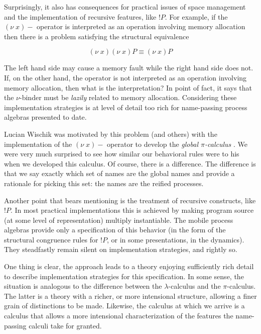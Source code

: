 \documentclass[]{amsart}
\newcommand{\scong}{\mathbin{\equiv}}
\theoremstyle{definition}
\theoremstyle{remark}
\numberwithin{equation}{subsection}
\newcommand{\pic}{$\pi$-calculus}
\begin{document}
Surprisingly, it also has consequences for practical issues of space
management and the implementation of recursive features, like
$!P$. For example, if the $(\nu \; x)-$ operator is interpreted as an
operation involving memory allocation then there is a problem
satisfying the structural equivalence

\begin{equation*}
	(\nu \; x)(\nu \; x)P \scong (\nu \; x)P
\end{equation*}

The left hand side may cause a memory fault while the right hand side
does not. If, on the other hand, the operator is not interpreted as an
operation involving memory allocation, then what is the
interpretation? In point of fact, it says that the $\nu$-binder must
be \textit{lazily} related to memory allocation. Considering these
implementation strategies is at level of detail too rich for
name-passing process algebras presented to date.

Lucian Wischik was motivated by this problem (and others) with the
implementation of the $(\nu \; x)-$ operator to develop the \textit{global
{\pic}} \cite{globalpi}. We were very much surprised to see how similar our
behavioral rules were to his when we developed this calculus. Of
course, there is a difference. The difference is that we say exactly
which set of names are the global names and provide a rationale for
picking this set: the names are the reified processes.

Another point that bears mentioning is the treatment of recursive
constructs, like $!P$. In most practical implementations this is
achieved by making program source (at some level of representation)
multiply instantiable. The mobile process algebras provide only a
specification of this behavior (in the form of the structural
congruence rules for $!P$, or in some presentations, in the
dynamics). They steadfastly remain silent on implementation
strategies, and rightly so. 

One thing is clear, the approach leads to a theory enjoying
sufficiently rich detail to describe implementation strategies for
this specification. In some sense, the situation is analogous to the
difference between the $\lambda$-calculus and the {\pic}. The latter
is a theory with a richer, or more intensional structure, allowing a
finer grain of distinctions to be made. Likewise, the calculus at
which we arrive is a calculus that allows a more intensional
characterization of the features the name-passing calculi take for
granted.
\end{document}
